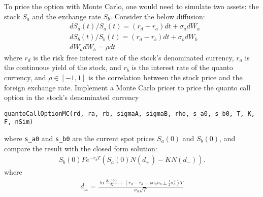 \documentclass[10pt,a4paper,hidelinks,fleqn]{article}            %
\begin{document}
To price the option with Monte Carlo, one would need to simulate two assets: the stock $S_a$ and the exchange rate $S_b$.
Consider the below diffusion:
\begin{align}
& dS_a(t) / S_a(t) = (r_d - r_a) dt + \sigma_a dW_a \\
& dS_b(t) / S_b(t) = (r_d - r_b) dt + \sigma_b dW_b \\
& dW_a dW_b = \rho dt
\end{align}
where $r_d$ is the risk free interest rate of the stock's denominated currency, $r_a$ is the continuous yield of the stock, and $r_b$ is the interest rate of the quanto currency, and $\rho \in [-1, 1]$ is the correlation between the stock price and the foreign exchange rate.
Implement a Monte Carlo pricer to price the quanto call option in the stock's denominated currency
\begin{verbatim}
quantoCallOptionMC(rd, ra, rb, sigmaA, sigmaB, rho, s_a0, s_b0, T, K, F, nSim)
\end{verbatim}
where \verb=s_a0= and \verb=s_b0= are the current spot prices $S_a(0)$ and $S_b(0)$, 
and compare the result with the closed form solution:
\begin{align}
S_b(0) F e^{-r_bT}\left( S_a(0) N(d_+) - K N(d_-)  \right).
\end{align}
where
\begin{align*}
d_{\pm} = \frac{\ln \frac{S_a(0)}{K} + (r_d - r_a - \rho \sigma_a \sigma_b \pm \frac{1}{2}\sigma_a^2)T}{\sigma_a \sqrt{T}}
\end{align*}
\end{document}
